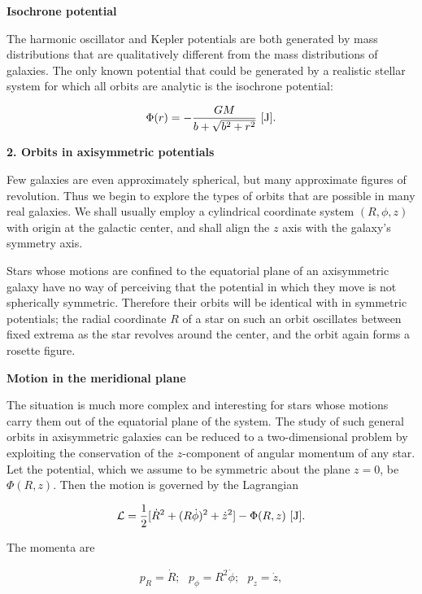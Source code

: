 \documentclass[a4paper,10pt]{article}
\begin{document}
{\noindent}\textbf{Isochrone potential}

{\noindent}The harmonic oscillator and Kepler potentials are both generated by mass distributions that are qualitatively different from the mass distributions of galaxies. The only known potential that could be generated by a realistic stellar system for which all orbits are analytic is the isochrone potential:

\begin{align*}
    \Phi(r) = - \frac{GM}{b + \sqrt{b^2+r^2}} ~ [{\rm J}].
\end{align*}

{\noindent}\textbf{2. Orbits in axisymmetric potentials}

{\noindent}Few galaxies are even approximately spherical, but many approximate figures of revolution. Thus we begin to explore the types of orbits that are possible in many real galaxies. We shall usually employ a cylindrical coordinate system $(R,\phi,z)$ with origin at the galactic center, and shall align the $z$ axis with the galaxy's symmetry axis.

{\noindent}Stars whose motions are confined to the equatorial plane of an axisymmetric galaxy have no way of perceiving that the potential in which they move is not spherically symmetric. Therefore their orbits will be identical with in symmetric potentials; the radial coordinate $R$ of a star on such an orbit oscillates between fixed extrema as the star revolves around the center, and the orbit again forms a rosette figure.

{\noindent}\textbf{Motion in the meridional plane}

{\noindent}The situation is much more complex and interesting for stars whose motions carry them out of the equatorial plane of the system. The study of such general orbits in axisymmetric galaxies can be reduced to a two-dimensional problem by exploiting the conservation of the $z$-component of angular momentum of any star. Let the potential, which we assume to be symmetric about the plane $z=0$, be $\Phi(R,z)$. Then the motion is governed by the Lagrangian

\begin{align*}
    \mathcal{L} = \frac{1}{2}[\dot{R}^2+(R\dot{\phi})^2+\dot{z}^2] - \Phi(R,z) ~ [{\rm J}].
\end{align*}

{\noindent}The momenta are

\begin{align*}
    p_R=\dot{R}; ~~~ p_\phi=R^2\dot{\phi}; ~~~ p_z=\dot{z},
\end{align*}
\end{document}
